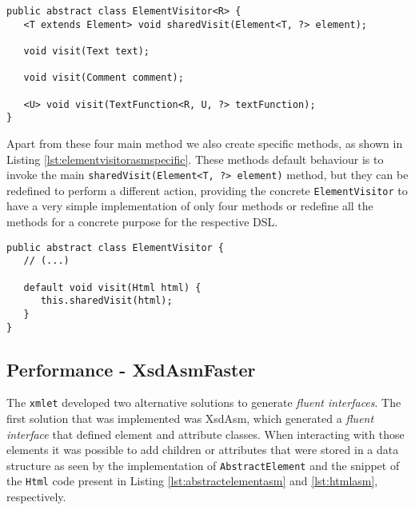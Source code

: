 \bigskip


\begin{minipage}{\linewidth}
\begin{lstlisting}[caption={ElementVisitor Generated by XsdAsm - The Core Methods},label={lst:elementvisitorasm}]
public abstract class ElementVisitor<R> {
   <T extends Element> void sharedVisit(Element<T, ?> element);

   void visit(Text text);

   void visit(Comment comment);

   <U> void visit(TextFunction<R, U, ?> textFunction);
}
\end{lstlisting}
\end{minipage}

\noindent
Apart from these four main method we also create specific methods, as shown in Listing \ref{lst:elementvisitorasmspecific}. These methods default behaviour is to invoke the main \texttt{sharedVisit(Element<T, ?> element)} method, but they can be redefined to perform a different action, providing the concrete \texttt{ElementVisitor} to have a very simple implementation of only four methods or redefine all the methods for a concrete purpose for the respective \ac{DSL}.

\bigskip


\begin{minipage}{\linewidth}
\begin{lstlisting}[caption={ElementVisitor Generated by XsdAsm - The Specific Methods},label={lst:elementvisitorasmspecific}]
public abstract class ElementVisitor {
   // (...)

   default void visit(Html html) {
      this.sharedVisit(html);
   }
}
\end{lstlisting}
\end{minipage}

\subsection{Performance - XsdAsmFaster}
\label{sec:xsdasmfaster}

The \texttt{xmlet} developed two alternative solutions to generate \textit{fluent interfaces}. The first solution that was implemented was XsdAsm, which generated a \textit{fluent interface} that defined element and attribute classes. When interacting with those elements it was possible to add children or attributes that were stored in a data structure as seen by the implementation of \texttt{AbstractElement} and the snippet of the \texttt{Html} code present in Listing \ref{lst:abstractelementasm} and \ref{lst:htmlasm}, respectively.

